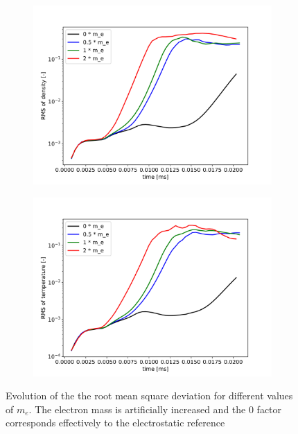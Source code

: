 \begin{figure}[H]\centering
	\begin{subfigure}[t]{0.45\textwidth}
		\centering
		\includegraphics[width=1\textwidth]{schemes/RMSn_meScan.jpg}
	\end{subfigure}
	\begin{subfigure}[t]{0.45\textwidth}
		\centering
		\includegraphics[width=1\textwidth]{schemes/RMST_meScan.jpg}
	\end{subfigure}
	\caption[Evolution of the the root mean square deviation for different values of $m_e$]{Evolution of the the root mean square deviation for different values of $m_e$. The electron mass is artificially increased and the 0 factor corresponds effectively to the electrostatic reference}
	\label{fig:CIRC_meScan}
\end{figure}


